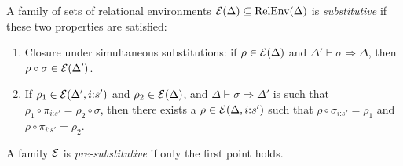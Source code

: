 \begin{definition}
  \label{defn:valid-rel-env-family}
  A family of sets of relational environments $\mathcal{E}(\Delta)
  \subseteq \mathrm{RelEnv}(\Delta)$ is \emph{substitutive} if these
  two properties are satisfied:
  \begin{enumerate}
  \item Closure under simultaneous substitutions: if $\rho \in
    \mathcal{E}(\Delta)$ and $\Delta' \vdash \sigma \Rightarrow \Delta$,
    then $\rho \circ \sigma \in \mathcal{E}(\Delta')$.
  \item If $\rho_1 \in \mathcal{E}(\Delta', i\mathord:s')$ and $\rho_2
    \in \mathcal{E}(\Delta)$, and $\Delta \vdash \sigma \Rightarrow
    \Delta'$ is such that $\rho_1 \circ \pi_{i\mathord:s'} = \rho_2
    \circ \sigma$, then there exists a $\rho \in \mathcal{E}(\Delta,
    i\mathord:s')$ such that $\rho \circ \sigma_{i\mathord:s'} =
    \rho_1$ and $\rho \circ \pi_{i\mathord:s'} = \rho_2$.
  \end{enumerate}
  A family $\mathcal{E}$ is \emph{pre-substitutive} if only the first
  point holds.
\end{definition}
